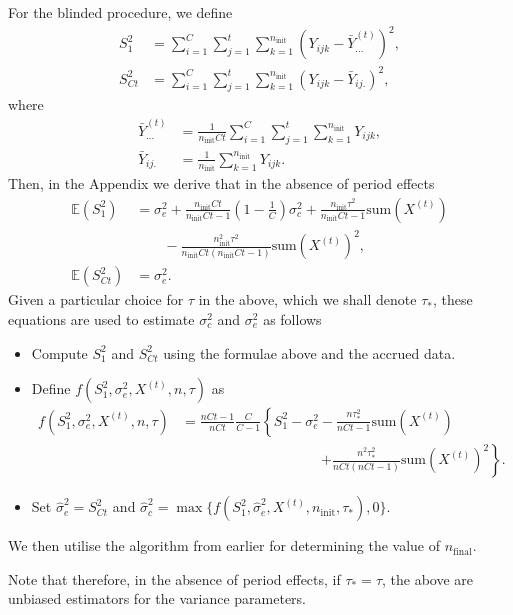 \documentclass{article}
\begin{document}
For the blinded procedure, we define
\begin{align*}
S_1^2 &= \sum_{i=1}^C \sum_{j=1}^t \sum_{k=1}^{n_\text{init}} (Y_{ijk} - \bar{Y}_{...}^{(t)})^2,\\
S_{Ct}^2 &= \sum_{i=1}^C \sum_{j=1}^t \sum_{k=1}^{n_\text{init}} (Y_{ijk} - \bar{Y}_{ij.})^2,
\end{align*}
where
\begin{align*}
\bar{Y}_{...}^{(t)} &= \frac{1}{n_\text{init}Ct}\sum_{i=1}^C \sum_{j=1}^t \sum_{k=1}^{n_\text{init}} Y_{ijk},\\
\bar{Y}_{ij.} &= \frac{1}{n_\text{init}}\sum_{k=1}^{n_\text{init}} Y_{ijk}.
\end{align*}
Then, in the Appendix we derive that in the absence of period effects
\begin{align*}
\mathbb{E}(S_1^2) &= \sigma_e^2 + \frac{n_\text{init}Ct}{n_\text{init}Ct-1}\left(1-\frac{1}{C}\right)\sigma_c^2 + \frac{n_\text{init}\tau^2}{n_\text{init}Ct-1}\text{sum}(X^{(t)}) \\
& \qquad - \frac{n_\text{init}^2\tau^2}{n_\text{init}Ct(n_\text{init}Ct-1)}\text{sum}(X^{(t)})^2,\\
\mathbb{E}(S_{Ct}^2) &= \sigma_e^2.
\end{align*}
Given a particular choice for $\tau$ in the above, which we shall denote $\tau_*$, these equations are used to estimate $\sigma_c^2$ and $\sigma_e^2$ as follows
\begin{itemize}
	\item Compute $S_1^2$ and $S_{Ct}^2$ using the formulae above and the accrued data.\\
	\item Define $f(S_1^2,\sigma_e^2,X^{(t)},n,\tau)$ as
	\begin{align*}
	f(S_1^2,\sigma_e^2,X^{(t)},n,\tau) &= \frac{nCt-1}{nCt}\frac{C}{C-1}\left\{S_1^2-\sigma_e^2-\frac{n\tau_*^2}{nCt-1}\text{sum}(X^{(t)})\right.\\ & \qquad \qquad \qquad \qquad \qquad  \left.+\frac{n^2\tau_*^2}{nCt(nCt-1)}\text{sum}(X^{(t)})^2 \right\}.
	\end{align*}
	\item Set $\hat{\sigma}_e^2=S_{Ct}^2$ and $\hat{\sigma}_c^2=\max\{f(S_1^2,\hat{\sigma}_e^2,X^{(t)},n_\text{init},\tau_*),0\}$.
\end{itemize}

We then utilise the algorithm from earlier for determining the value of $n_\text{final}$.

Note that therefore, in the absence of period effects, if $\tau_*=\tau$, the above are unbiased estimators for the variance parameters.
\end{document}
